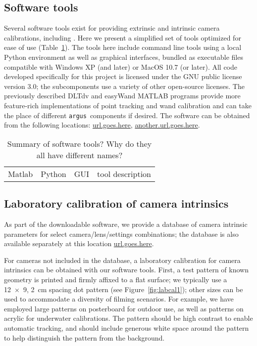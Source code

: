 \documentclass[fleqn,10pt]{wlpeerj}
\newcommand{\argus}{\texttt{argus}}
\begin{document}
\subsection*{Software tools}
Several software tools exist for providing extrinsic and intrinsic camera calibrations, including \citep{bouguet2004camera,Hedrick2008,lour09,Theriault:2014}.  Here we present a simplified set of tools optimized for ease of use (Table~\ref{table:softwarez}).  The tools here include command line tools using a local Python environment as well as graphical interfaces, bundled as executable files compatible with Windows XP (and later) or MacOS 10.7 (or later).  All code developed specifically for this project is licensed under the GNU public license version 3.0; the subcomponents use a variety of other open-source licenses. The previously described DLTdv \citep{Hedrick2008} and easyWand \citep{Theriault:2014} MATLAB programs provide more feature-rich implementations of point tracking and wand calibration and can take the place of different \argus\ components if desired.  The software can be obtained from the following locations: \url{url.goes.here}, \url{another.url.goes.here}. 

\begin{table}
\caption{Summary of software tools?  Why do they all have different names?}
\label{table:softwarez}
\begin{center}
\begin{tabular}{cccc}
Matlab & Python & GUI & tool description \\
\end{tabular}
\end{center}
\end{table}






\subsection*{Laboratory calibration of camera intrinsics}
As part of the downloadable software, we provide a database of camera intrinsic parameters for select camera/lens/settings combinations; the database is also available separately at this location \url{url.goes.here}. 

For cameras not included in the database, a laboratory calibration for camera intrinsics can be obtained with our software tools. First, a test pattern of known geometry is printed and firmly affixed to a flat surface; we typically use a \num{12 x 9}, \SI{2}{\centi\meter} spacing dot pattern (see Figure~\ref{fig:labcal1}); other sizes can be used to accommodate a diversity of filming scenarios.  For example, we have employed large patterns on posterboard for outdoor use, as well as patterns on acrylic for underwater calibrations.%
The pattern should be high contrast to enable automatic tracking, and should include generous white space around the pattern to help distinguish the pattern from the background. 
\end{document}
